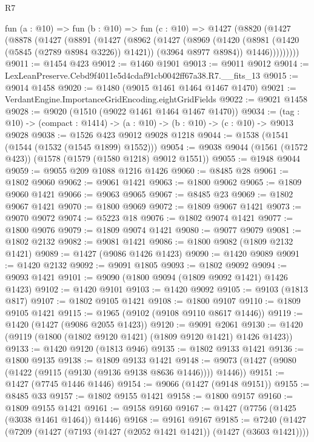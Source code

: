 \begin{lexlean}{R7}
\begin{coremodule}
  fun (a : @10) =>
  fun (b : @10) =>
  fun (c : @10) =>
  @1427
    (@8820
      (@1427
        (@8878
          (@1427
            (@8891
              (@1427
                (@8962
                  (@1427
                    (@8969
                      (@1420 (@8981 (@1420 (@5845 (@2789 @8984 @3226)) @1421)) (@3964 @8977 @8984))
                      @1446)))))))))
@9011 := @1454 @423
@9012 := @1460 @1901
@9013 := @9011 @9012
@9014 := LexLeanPreserve.Cebd9f4011e5d4cdaf91cb0042ff67a38.R7.__fits_13
@9015 := @9014 @1458
@9020 := @1480 (@9015 @1461 @1464 @1467 @1470)
@9021 := VerdantEngine.ImportanceGridEncoding.eightGridFields
@9022 := @9021 @1458
@9028 := @9020 (@1510 (@9022 @1461 @1464 @1467 @1470))
@9034 := (tag : @10) -> (compact : @1414) -> (a : @10) -> (b : @10) -> (c : @10) -> @9013 @9028
@9038 := @1526 @423 @9012 @9028 @1218
@9044 := @1538 (@1541 (@1544 (@1532 (@1545 @1899) @1552)))
@9054 := @9038 @9044 (@1561 (@1572 @423)) (@1578 (@1579 (@1580 @1218) @9012 @1551))
@9055 := @1948 @9044
@9059 := @9055 @209 @1088 @1216 @1426
@9060 := @8485 @28
@9061 := @1802 @9060
@9062 := @9061 @1421
@9063 := @1800 @9062
@9065 := @1809 @9060 @1421
@9066 := @9063 @9065
@9067 := @8485 @23
@9069 := @1802 @9067 @1421
@9070 := @1800 @9069
@9072 := @1809 @9067 @1421
@9073 := @9070 @9072
@9074 := @5223 @18
@9076 := @1802 @9074 @1421
@9077 := @1800 @9076
@9079 := @1809 @9074 @1421
@9080 := @9077 @9079
@9081 := @1802 @2132
@9082 := @9081 @1421
@9086 := @1800 @9082 (@1809 @2132 @1421)
@9089 := @1427 (@9086 @1426 @1423)
@9090 := @1420 @9089
@9091 := @1420 @2132
@9092 := @9091 @1805
@9093 := @1802 @9092
@9094 := @9093 @1421
@9101 := @9090 (@1800 @9094 (@1809 @9092 @1421) @1426 @1423)
@9102 := @1420 @9101
@9103 := @1420 @9092
@9105 := @9103 (@1813 @817)
@9107 := @1802 @9105 @1421
@9108 := @1800 @9107
@9110 := @1809 @9105 @1421
@9115 := @1965 (@9102 (@9108 @9110 @8617 @1446))
@9119 := @1420 (@1427 (@9086 @2055 @1423))
@9120 := @9091 @2061
@9130 := @1420 (@9119 (@1800 (@1802 @9120 @1421) (@1809 @9120 @1421) @1426 @1423))
@9133 := @1420 @9120 (@1813 @946)
@9135 := @1802 @9133 @1421
@9136 := @1800 @9135
@9138 := @1809 @9133 @1421
@9148 := @9073 (@1427 (@9080 (@1422 (@9115 (@9130 (@9136 @9138 @8636 @1446)))) @1446))
@9151 := @1427 (@7745 @1446 @1446)
@9154 := @9066 (@1427 (@9148 @9151))
@9155 := @8485 @33
@9157 := @1802 @9155 @1421
@9158 := @1800 @9157
@9160 := @1809 @9155 @1421
@9161 := @9158 @9160
@9167 := @1427 (@7756 (@1425 (@3038 @1461 @1464)) @1446)
@9168 := @9161 @9167
@9185 := @7240
    (@1427
      (@7209
        (@1427 (@7193 (@1427 (@2052 @1421 @1421)) (@1427 (@3603 @1421))))

\end{coremodule}
\end{lexlean}
